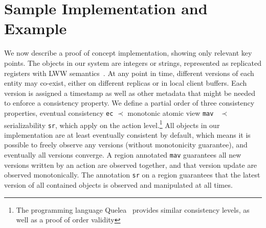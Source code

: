 \documentclass[preprint,numbers]{sigplanconf}
\begin{document}
%


\section{Sample Implementation and Example}
We now describe a proof of concept implementation, showing only
relevant key points. The objects in our system are integers or strings, represented as replicated registers with LWW
semantics~\cite{burckhardt2014replicated}. At any point in time, different
versions of each entity may
co-exist, either on different replicas or in local client buffers. Each version
is assigned a timestamp as well as other metadata that might be needed to
enforce a consistency property. We define a partial order of three consistency properties, eventual
consistency \texttt{ec} $\prec$ monotonic atomic view \texttt{mav}~\cite{bailis2013highly}  $\prec$
serializability \texttt{sr}, which apply on the action level.\footnote{The programming language Quelea~\cite{sivaramakrishnan2015declarative} provides similar
consistency levels, as well as a proof of order validity} 
All objects in our implementation are at least eventually consistent by default, which means it
is possible to freely observe any versions (without monotonicity guarantee), and
eventually all versions converge. A region annotated \texttt{mav} guarantees all new versions written by an
action are observed together, and that version update are observed monotonically. The annotation \texttt{sr} on a
region guarantees that the latest version of all
contained objects is observed and manipulated at all times. 
\end{document}
